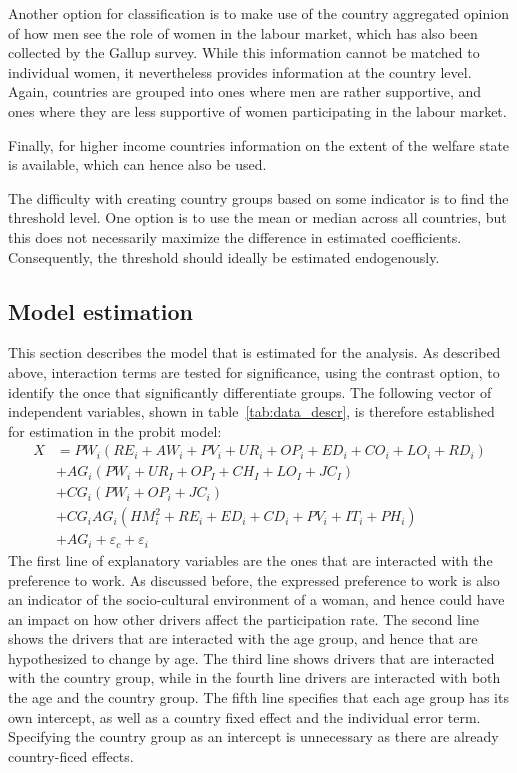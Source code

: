 Another option for classification is to make use of the country aggregated opinion of how men see the role of women in the labour market, which has also been collected by the Gallup survey. While this information cannot be matched to individual women, it nevertheless provides information at the country level. Again, countries are grouped into ones where men are rather supportive, and ones where they are less supportive of women participating in the labour market.

Finally, for higher income countries information on the extent of the welfare state is available, which can hence also be used.

The difficulty with creating country groups based on some indicator is to find the threshold level. One option is to use the mean or median across all countries, but this does not necessarily maximize the difference in estimated coefficients. Consequently, the threshold should ideally be estimated endogenously.

\subsection{Model estimation}
This section describes the model that is estimated for the analysis. As described above, interaction terms are tested for significance, using the contrast option, to identify the once that significantly differentiate groups. The following vector of independent variables, shown in table~\ref{tab:data_descr}, is therefore established for estimation in the probit model:
\begin{align}
X &= PW_i (RE_i + AW_i + PV_i + UR_i + OP_i + ED_i + CO_i + LO_i + RD_i)\nonumber\\
&+ AG_i(PW_i + UR_I + OP_I + CH_I + LO_I + JC_I)\nonumber\\
& + CG_i (PW_i + OP_i + JC_i) \nonumber\\
& + CG_i AG_i (HM^2_i+RE_i+ED_i+CD_i+PV_i+IT_i+PH_i)\nonumber\\
& +AG_i + \varepsilon_c + \varepsilon_i \label{eq:specification}
\end{align}
The first line of explanatory variables are the ones that are interacted with the preference to work. As discussed before, the expressed preference to work is also an indicator of the socio-cultural environment of a woman, and hence could have an impact on how other drivers affect the participation rate. The second line shows the drivers that are interacted with the age group, and hence that are hypothesized to change by age. The third line shows drivers that are interacted with the country group, while in the fourth line drivers are interacted with both the age and the country group. The fifth line specifies that each age group has its own intercept, as well as a country fixed effect and the individual error term. Specifying the country group as an intercept is unnecessary as there are already country-ficed effects.


